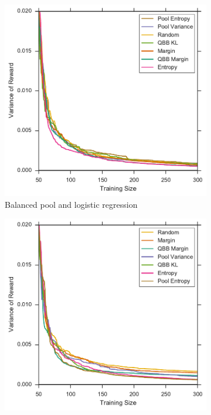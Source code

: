 \begin{figure}[p]
	\centering
	\begin{subfigure}{.5\textwidth}
		\centering
		\includegraphics[width=\textwidth]{figures/5_thompson/vstatlas_bl_sigmas}
		\caption{Balanced pool and logistic regression}
		\label{fig:vstatlas_bl_sigmas}
	\end{subfigure}%
	\begin{subfigure}{.5\textwidth}
		\centering
		\includegraphics[width=\linewidth]{figures/5_thompson/vstatlas_br_sigmas}

\end{subfigure}
\end{figure}
